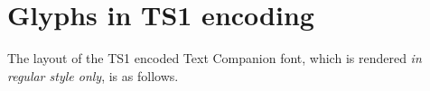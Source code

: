 \documentclass[11pt]{article}
\begin{document}
\section*{Glyphs in TS1 encoding}
The layout of the TS1 encoded Text Companion font, which is rendered \emph{in regular style only}, is as follows. 

\end{document}
